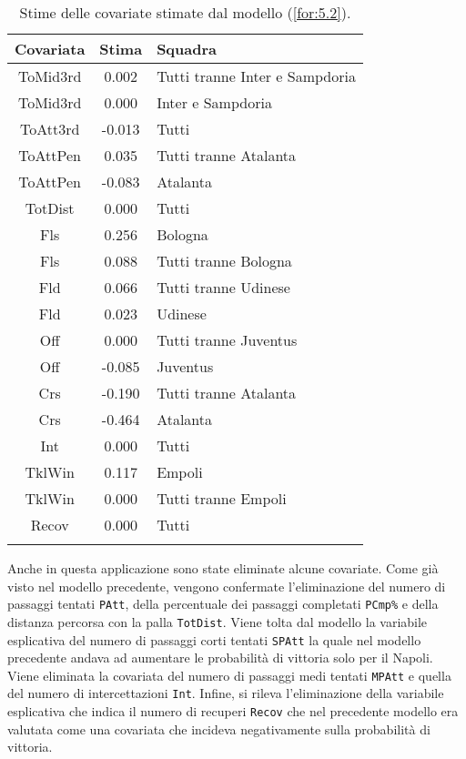 \begin{table}[]%
	
	\renewcommand{\arraystretch}{1.7}
	\centering
	\begin{tabular}{ccp{10cm}}
		\hline	
		\rowcolor{SchoolColor2}
		\textbf{Covariata} & \textbf{Stima} & \textbf{Squadra} \\	
		\hline
		ToMid3rd & 0.002 & Tutti tranne Inter e Sampdoria\\
		ToMid3rd & 0.000 & Inter e Sampdoria\\
		ToAtt3rd & -0.013 & Tutti \\  
		ToAttPen & 0.035 & Tutti tranne Atalanta \\    
		ToAttPen & -0.083 & Atalanta \\ 	     	 
		TotDist & 0.000 & Tutti \\	
		Fls & 0.256 & Bologna  \\
		Fls & 0.088 & Tutti tranne Bologna \\ 		
		Fld & 0.066 & Tutti tranne Udinese \\
		Fld & 0.023 & Udinese \\
		Off & 0.000 & Tutti tranne Juventus\\
		Off & -0.085 & Juventus  \\
		Crs & -0.190 & Tutti tranne Atalanta\\
		Crs & -0.464 & Atalanta \\
		Int & 0.000 & Tutti\\
		TklWin &  0.117 & Empoli  \\
		TklWin &  0.000 & Tutti tranne Empoli  \\ 
		Recov &  0.000 & Tutti \\ 
		\hline
		& &  \\
		
	\end{tabular} \hbox{}
	\caption{Stime delle covariate stimate dal modello (\ref{for:5.2}).} \label{tab:BTCLI3} 
	
\end{table}
Anche in questa applicazione sono state eliminate alcune covariate. Come già visto nel modello precedente, vengono confermate l'eliminazione del numero di passaggi tentati \texttt{PAtt}, della percentuale dei passaggi completati \texttt{PCmp\%} e della distanza percorsa con la palla \texttt{TotDist}. Viene tolta dal modello la variabile esplicativa del numero di passaggi corti tentati \texttt{SPAtt} la quale nel modello precedente andava ad aumentare le probabilità di vittoria solo per il Napoli. Viene eliminata la covariata del numero di passaggi medi tentati \texttt{MPAtt} e quella del numero di intercettazioni \texttt{Int}. Infine, si rileva l'eliminazione della variabile esplicativa che indica il numero di recuperi \texttt{Recov} che nel precedente modello era valutata come una covariata che incideva negativamente sulla probabilità di vittoria.\\
